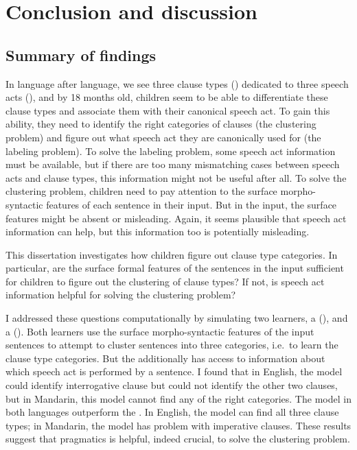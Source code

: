 \chapter{Conclusion and discussion}
\label{chap:discussion}

\section{Summary of findings}
In language after language, we see three clause types (\diis{}) dedicated to three speech acts (\aqrs{}), and by 18 months old, children seem to be able to differentiate these clause types and associate them with their canonical speech act. To gain this ability, they need to identify the right categories of clauses (the clustering problem) and figure out what speech act they are canonically used for (the labeling problem). To solve the labeling problem, some speech act information must be available, but if there are too many mismatching cases between speech acts and clause types, this information might not be useful after all. To solve the clustering problem, children need to pay attention to the surface morpho-syntactic features of each sentence in their input. But in the input, the surface features might be absent or misleading. Again, it seems plausible that speech act information can help, but this information too is potentially misleading.

This dissertation investigates how children figure out clause type categories. In particular, are the surface formal features of the sentences in the input sufficient for children to figure out the clustering of clause types? If not, is speech act information helpful for solving the clustering problem?

I addressed these questions computationally by simulating two learners, a \distlearner{} (\dlearnerabbr{}), and a \praglearner{} (\plearnerabbr{}). Both learners use the surface morpho-syntactic features of the input sentences to attempt to cluster sentences into three categories, i.e.\ to learn the clause type categories. But the \plearnerabbr{} additionally has access to information about which speech act is performed by a sentence. I found that in English, the \dlearnerabbr{} model could identify interrogative clause but could not identify the other two clauses, but in Mandarin, this model cannot find any of the right categories. The \plearnerabbr{} model in both languages outperform the \dlearnerabbr{}. In English, the \plearnerabbr{} model can find all three clause types; in Mandarin, the model  has problem with imperative clauses. These results suggest that pragmatics is helpful, indeed crucial, to solve the clustering problem. 

